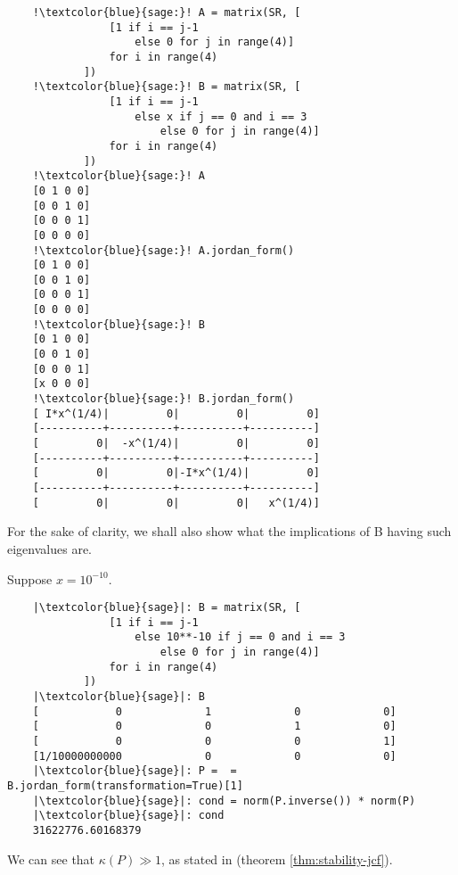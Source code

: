\begin{example}
\begin{verbatim}
    !\textcolor{blue}{sage:}! A = matrix(SR, [
                [1 if i == j-1
                    else 0 for j in range(4)]
                for i in range(4)
            ])
    !\textcolor{blue}{sage:}! B = matrix(SR, [
                [1 if i == j-1
                    else x if j == 0 and i == 3
                        else 0 for j in range(4)]
                for i in range(4)
            ])
    !\textcolor{blue}{sage:}! A
    [0 1 0 0]
    [0 0 1 0]
    [0 0 0 1]
    [0 0 0 0]
    !\textcolor{blue}{sage:}! A.jordan_form()
    [0 1 0 0]
    [0 0 1 0]
    [0 0 0 1]
    [0 0 0 0]
    !\textcolor{blue}{sage:}! B
    [0 1 0 0]
    [0 0 1 0]
    [0 0 0 1]
    [x 0 0 0]
    !\textcolor{blue}{sage:}! B.jordan_form()
    [ I*x^(1/4)|         0|         0|         0]
    [----------+----------+----------+----------]
    [         0|  -x^(1/4)|         0|         0]
    [----------+----------+----------+----------]
    [         0|         0|-I*x^(1/4)|         0]
    [----------+----------+----------+----------]
    [         0|         0|         0|   x^(1/4)]

\end{verbatim}

For the sake of clarity, we shall also show what the implications of B having such eigenvalues are.

Suppose \(x = 10^{-10}\).

\begin{verbatim}
    |\textcolor{blue}{sage}|: B = matrix(SR, [
                [1 if i == j-1
                    else 10**-10 if j == 0 and i == 3
                        else 0 for j in range(4)]
                for i in range(4)
            ])
    |\textcolor{blue}{sage}|: B
    [            0             1             0             0]
    [            0             0             1             0]
    [            0             0             0             1]
    [1/10000000000             0             0             0]
    |\textcolor{blue}{sage}|: P =  = B.jordan_form(transformation=True)[1]
    |\textcolor{blue}{sage}|: cond = norm(P.inverse()) * norm(P)
    |\textcolor{blue}{sage}|: cond
    31622776.60168379
\end{verbatim}
We can see that \(\kappa(P) \gg 1\), as stated in  (theorem \ref{thm:stability-jcf}).

\end{example}
